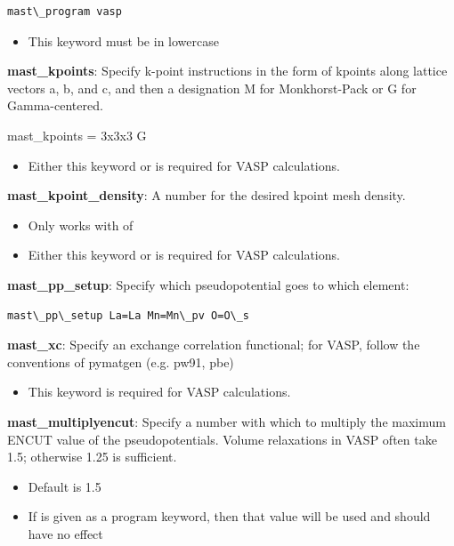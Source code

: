 \documentclass[letterpaper,10pt,english]{sphinxmanual}
\begin{document}
\begin{Verbatim}[commandchars=\\\{\}]
mast\_program vasp
\end{Verbatim}
\begin{itemize}
\item {} 
This keyword must be in lowercase

\end{itemize}

\textbf{mast\_kpoints}: Specify k-point instructions in the form of kpoints along lattice vectors a, b, and c, and then a designation M for Monkhorst-Pack or G for Gamma-centered.

mast\_kpoints = 3x3x3 G
\begin{itemize}
\item {} 
Either this keyword or  is required for VASP calculations.

\end{itemize}

\textbf{mast\_kpoint\_density}: A number for the desired kpoint mesh density.
\begin{itemize}
\item {} 
Only works with  of 

\item {} 
Either this keyword or  is required for VASP calculations.

\end{itemize}

\textbf{mast\_pp\_setup}: Specify which pseudopotential goes to which element:

\begin{Verbatim}[commandchars=\\\{\}]
mast\_pp\_setup La=La Mn=Mn\_pv O=O\_s
\end{Verbatim}

\textbf{mast\_xc}: Specify an exchange correlation functional; for VASP, follow the conventions of pymatgen (e.g. pw91, pbe)
\begin{itemize}
\item {} 
This keyword is required for VASP calculations.

\end{itemize}

\textbf{mast\_multiplyencut}: Specify a number with which to multiply the maximum ENCUT value of the pseudopotentials. Volume relaxations in VASP often take 1.5; otherwise 1.25 is sufficient.
\begin{itemize}
\item {} 
Default is 1.5

\item {} 
If  is given as a program keyword, then that value will be used and  should have no effect

\end{itemize}
\end{document}
